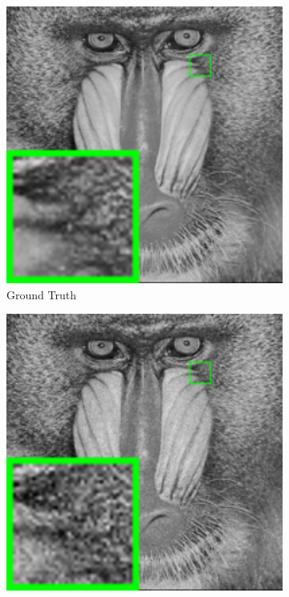 \begin{figure}
\begin{adjustwidth}{-2cm}{}
    \centering
    \begin{subfigure}[t]{0.19\textwidth}
        \centering
        \includegraphics[width=1\textwidth]{images/twsc/awgn/resize_br_baboon.png}
	   \caption{Ground Truth}
    \end{subfigure}
    \hfill
    \begin{subfigure}[t]{0.19\textwidth}
        \centering
        \includegraphics[width=1\textwidth]{images/twsc/awgn/resize_br_20_baboon.png}

\end{subfigure}
\end{adjustwidth}
\end{figure}
